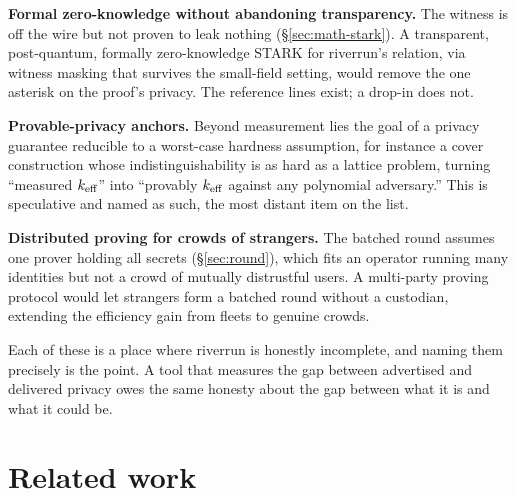 \documentclass[11pt]{article}
\begin{document}
\textbf{Formal zero-knowledge without abandoning transparency.} The witness is off the wire
but not proven to leak nothing (\S\ref{sec:math-stark}). A transparent, post-quantum,
formally zero-knowledge STARK for riverrun's relation, via witness masking that survives the
small-field setting, would remove the one asterisk on the proof's privacy. The reference
lines exist; a drop-in does not.

\textbf{Provable-privacy anchors.} Beyond measurement lies the goal of a privacy guarantee
reducible to a worst-case hardness assumption, for instance a cover construction whose
indistinguishability is as hard as a lattice problem, turning ``measured $k_{\mathrm{eff}}$'' into
``provably $k_{\mathrm{eff}}$ against any polynomial adversary.'' This is speculative and named as such,
the most distant item on the list.

\textbf{Distributed proving for crowds of strangers.} The batched round assumes one prover
holding all secrets (\S\ref{sec:round}), which fits an operator running many identities but
not a crowd of mutually distrustful users. A multi-party proving protocol would let strangers
form a batched round without a custodian, extending the efficiency gain from fleets to
genuine crowds.

Each of these is a place where riverrun is honestly incomplete, and naming them precisely is
the point. A tool that measures the gap between advertised and delivered privacy owes the same
honesty about the gap between what it is and what it could be.

\section{Related work}
\label{sec:related}
\end{document}
